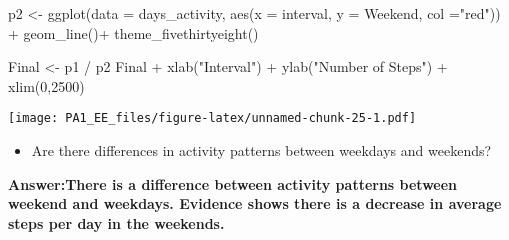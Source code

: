 \documentclass[
]{article}
\newenvironment{Shaded}{\begin{snugshade}}{\end{snugshade}}
\newcommand{\AttributeTok}[1]{\textcolor[rgb]{0.77,0.63,0.00}{#1}}
\newcommand{\DecValTok}[1]{\textcolor[rgb]{0.00,0.00,0.81}{#1}}
\newcommand{\FunctionTok}[1]{\textcolor[rgb]{0.00,0.00,0.00}{#1}}
\newcommand{\NormalTok}[1]{#1}
\newcommand{\OtherTok}[1]{\textcolor[rgb]{0.56,0.35,0.01}{#1}}
\newcommand{\SpecialCharTok}[1]{\textcolor[rgb]{0.00,0.00,0.00}{#1}}
\newcommand{\StringTok}[1]{\textcolor[rgb]{0.31,0.60,0.02}{#1}}
\providecommand{\tightlist}{%
  \setlength{\itemsep}{0pt}\setlength{\parskip}{0pt}}
\begin{document}
\begin{Shaded}
\begin{Highlighting}[]
\NormalTok{p2 }\OtherTok{\textless{}{-}} \FunctionTok{ggplot}\NormalTok{(}\AttributeTok{data =}\NormalTok{ days\_activity, }\FunctionTok{aes}\NormalTok{(}\AttributeTok{x =}\NormalTok{ interval, }\AttributeTok{y =}\NormalTok{ Weekend, }\AttributeTok{col =}\StringTok{"red"}\NormalTok{)) }\SpecialCharTok{+} 
  \FunctionTok{geom\_line}\NormalTok{()}\SpecialCharTok{+} \FunctionTok{theme\_fivethirtyeight}\NormalTok{()}
\end{Highlighting}
\end{Shaded}

\begin{Shaded}
\begin{Highlighting}[]
\NormalTok{Final }\OtherTok{\textless{}{-}}\NormalTok{ p1 }\SpecialCharTok{/}\NormalTok{ p2}
\NormalTok{Final }\SpecialCharTok{+} \FunctionTok{xlab}\NormalTok{(}\StringTok{"Interval"}\NormalTok{) }\SpecialCharTok{+} \FunctionTok{ylab}\NormalTok{(}\StringTok{"Number of Steps"}\NormalTok{) }\SpecialCharTok{+}
  \FunctionTok{xlim}\NormalTok{(}\DecValTok{0}\NormalTok{,}\DecValTok{2500}\NormalTok{)}
\end{Highlighting}
\end{Shaded}

\texttt{[image: PA1\_EE\_files/figure-latex/unnamed-chunk-25-1.pdf]}

\begin{itemize}
\tightlist
\item
  Are there differences in activity patterns between weekdays and
  weekends?
\end{itemize}

\textbf{Answer:There is a difference between activity patterns between
weekend and weekdays. Evidence shows there is a decrease in average
steps per day in the weekends.}
\end{document}
